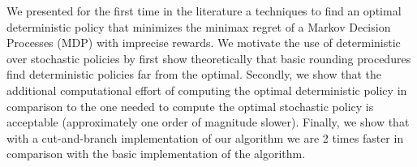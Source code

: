 We presented for the first time in the literature a techniques to find an optimal deterministic policy that minimizes the minimax regret of a Markov Decision Processes (MDP) with imprecise rewards.
We motivate the use of deterministic over stochastic policies by first show theoretically that basic rounding procedures find deterministic policies far from the optimal. Secondly, we show that the additional computational effort of computing the optimal deterministic policy in comparison to the one needed to compute the optimal stochastic policy is acceptable (approximately one order of magnitude slower). Finally, we show that with a cut-and-branch implementation of our algorithm we are 2 times faster in comparison with the basic implementation of the algorithm. 